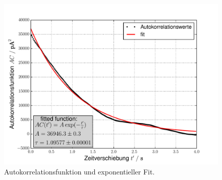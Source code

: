 \documentclass{include/thesisclass3}
\begin{document}
\begin{figure}[H]
\centering
\includegraphics[scale=0.7]{images/AC.pdf}
\caption{Autokorrelationsfunktion und exponentieller Fit.}
\label{AC}
\end{figure}
\end{document}
